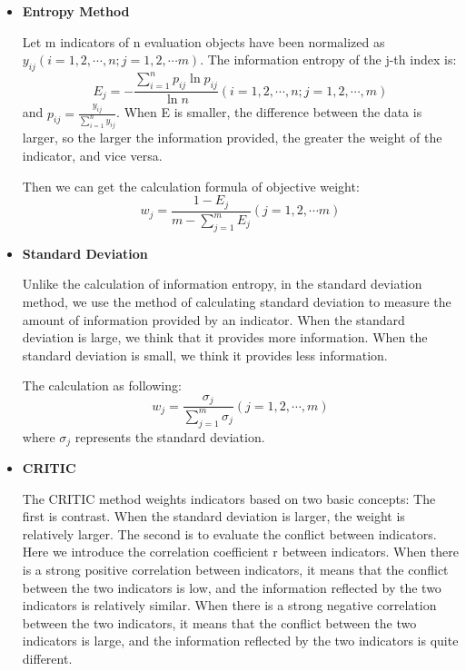 \documentclass[12pt]{article}  %
\begin{document}
\begin{itemize}
	\item \textbf{Entropy Method}
	
	Let m indicators of n evaluation objects have been normalized as $y_{ij} \left( {i = 1,2, \cdots ,n;j = 1,2, \cdots m} \right)$. The information entropy of the j-th index is:
	\begin{equation}
		{E_j} =  - \frac{{\sum\limits_{i = 1}^n {{p_{ij}}\ln {p_{ij}}} }}{{\ln n}}\left( {i = 1,2, \cdots ,n;j = 1,2, \cdots ,m} \right)
	\end{equation}
	and ${p_{ij}} = \frac{{{y_{ij}}}}{{\sum\limits_{i = 1}^n {{y_{ij}}} }}$.
	When E is smaller, the difference between the data is larger, so the larger the information provided, the greater the weight of the indicator, and vice versa.
	
	Then we can get the calculation formula of objective weight:
	\begin{equation}
		{w_j} = \frac{{1 - {E_j}}}{{m - \sum\limits_{j = 1}^m {{E_j}} }}(j = 1,2, \cdots m)
	\end{equation}
	
	\item \textbf{Standard Deviation}
	
	Unlike the calculation of information entropy, in the standard deviation method, we use the method of calculating standard deviation to measure the amount of information provided by an indicator. When the standard deviation is large, we think that it provides more information. When the standard deviation is small, we think it provides less information.
	
	The calculation as following:
	\begin{equation}
		{w_j} = \frac{{{\sigma _j}}}{{\sum\limits_{j = 1}^m {{\sigma _j}} }}(j = 1,2, \cdots ,m)
	\end{equation}
	where $\sigma _j$ represents the standard deviation.
	
	\item \textbf{CRITIC}
	
	The CRITIC method weights indicators based on two basic concepts: The first is contrast. When the standard deviation is larger, the weight is relatively larger. The second is to evaluate the conflict between indicators. Here we introduce the correlation coefficient r between indicators. When there is a strong positive correlation between indicators, it means that the conflict between the two indicators is low, and the information reflected by the two indicators is relatively similar. When there is a strong negative correlation between the two indicators, it means that the conflict between the two indicators is large, and the information reflected by the two indicators is quite different.
	

\end{itemize}
\end{document}
